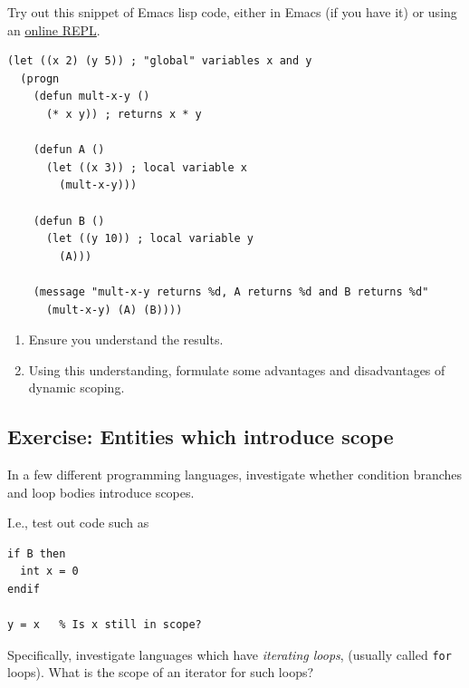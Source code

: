\documentclass[11pt]{article}
\theoremstyle{definition}
\begin{document}
Try out this snippet of Emacs lisp code,
either in Emacs (if you have it) or using an
\href{https://repl.it/languages/elisp}{online REPL}.
\begin{verbatim}
(let ((x 2) (y 5)) ; "global" variables x and y
  (progn
    (defun mult-x-y ()
      (* x y)) ; returns x * y

    (defun A ()
      (let ((x 3)) ; local variable x
        (mult-x-y)))

    (defun B ()
      (let ((y 10)) ; local variable y
        (A)))

    (message "mult-x-y returns %d, A returns %d and B returns %d"
      (mult-x-y) (A) (B))))
\end{verbatim}

\begin{enumerate}
\item Ensure you understand the results.
\item Using this understanding, formulate some advantages and disadvantages
of dynamic scoping.
\end{enumerate}

\subsection{Exercise: Entities which introduce scope}
\label{sec:org4d2e7a6}

In a few different programming languages, investigate whether
condition branches and loop bodies introduce scopes.

I.e., test out code such as
\begin{verbatim}
if B then
  int x = 0
endif

y = x   % Is x still in scope?
\end{verbatim}

Specifically, investigate languages which have \emph{iterating loops},
(usually called \texttt{for} loops). What is the scope of an iterator
for such loops?
\end{document}
